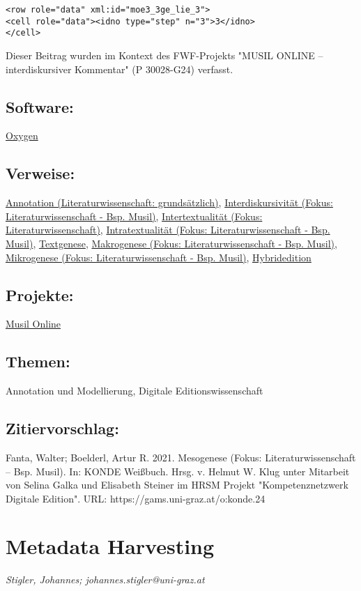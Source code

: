 \documentclass{article}
\begin{document}
        \begin{verbatim}<row role="data" xml:id="moe3_3ge_lie_3"> 
<cell role="data"><idno type="step" n="3">3</idno>
</cell>\end{verbatim}Dieser Beitrag wurden im Kontext des FWF-Projekts "MUSIL ONLINE – interdiskursiver Kommentar" 
                  (P 30028-G24) verfasst.\subsection*{Software:}\href{http://oxygenxml.com/}{Oxygen}\subsection*{Verweise:}\href{https://gams.uni-graz.at/o:konde.17}{Annotation (Literaturwissenschaft:
                           grundsätzlich)}, \href{https://gams.uni-graz.at/o:konde.19}{Interdiskursivität (Fokus:
                           Literaturwissenschaft - Bsp. Musil)}, \href{https://gams.uni-graz.at/o:konde.20}{Intertextualität (Fokus:
                           Literaturwissenschaft)}, \href{https://gams.uni-graz.at/o:konde.21}{Intratextualität (Fokus:
                           Literaturwissenschaft - Bsp. Musil)}, \href{https://gams.uni-graz.at/o:konde.28}{Textgenese}, \href{https://gams.uni-graz.at/o:konde.23}{Makrogenese (Fokus:
                           Literaturwissenschaft - Bsp. Musil)}, \href{https://gams.uni-graz.at/o:konde.26}{Mikrogenese (Fokus:
                           Literaturwissenschaft - Bsp. Musil)}, \href{https://gams.uni-graz.at/o:konde.96}{Hybridedition}\subsection*{Projekte:}\href{http://musilonline.at}{Musil Online}\subsection*{Themen:}Annotation und Modellierung, Digitale Editionswissenschaft\subsection*{Zitiervorschlag:}Fanta, Walter; Boelderl, Artur R. 2021. Mesogenese (Fokus: Literaturwissenschaft – Bsp. Musil). In: KONDE Weißbuch. Hrsg. v. Helmut W. Klug unter Mitarbeit von Selina Galka und Elisabeth Steiner im HRSM Projekt "Kompetenznetzwerk Digitale Edition". URL: https://gams.uni-graz.at/o:konde.24\newpage\section*{Metadata Harvesting} \emph{Stigler, Johannes; johannes.stigler@uni-graz.at }\\
        
\end{document}

